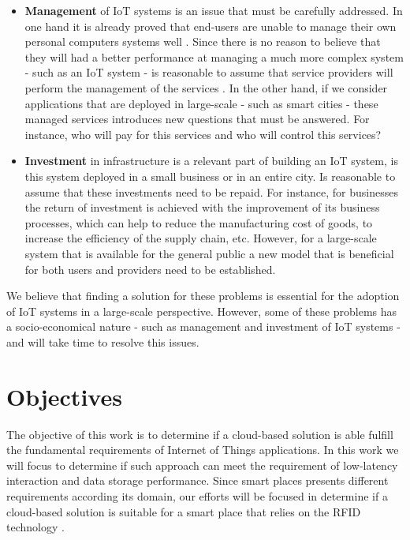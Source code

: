 \begin{itemize}
  \item \textbf{Management} of IoT systems is an issue that must be carefully addressed. In one hand
  it is already proved that end-users are unable to manage their own personal computers systems well
  \cite{doll1988measurement}. Since there is no reason to believe that they will had a better
  performance at managing a much more complex system - such as an \gls{IoT} system - is reasonable to
  assume that service providers will perform the management of the services . In the other hand, if we
  consider applications that are deployed in large-scale - such as smart cities - these managed
  services introduces new questions that must be answered. For instance, who will pay for this
  services and who will control this services?
  \item \textbf{Investment} in infrastructure is a relevant part of building an \gls{IoT} system,
  is this system deployed in a small business or in an entire city. Is reasonable to assume that
  these investments need to be repaid. For instance, for businesses the return of investment is
  achieved with the improvement of its business processes, which can help to reduce the manufacturing
  cost of goods, to increase the efficiency of the supply chain, etc. However, for a large-scale
  system that is available for the general public a new model that is beneficial for both users and
  providers need to be established.
\end{itemize}

We believe that finding a solution for these problems is essential for the adoption of \gls{IoT} systems
in a large-scale perspective. However, some of these problems has a socio-economical nature - such as
management and investment of \gls{IoT} systems - and will take time to resolve this issues.

\section{Objectives}
\label{section:objectives}
The objective of this work is to determine if a cloud-based solution is able fulfill the fundamental
requirements of Internet of Things applications. In this work we will focus to determine if such approach can meet
the requirement of low-latency interaction and data storage performance. Since smart places presents
different requirements according its domain, our efforts will be focused in determine if a cloud-based
solution is suitable for a smart place that relies on the RFID technology \cite{want2006introduction}.\\

